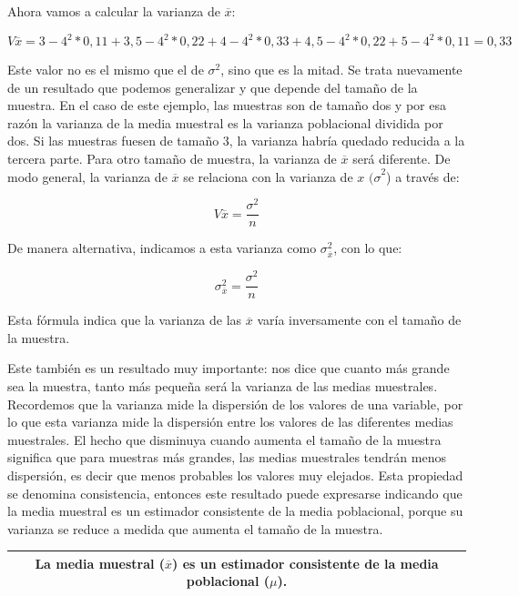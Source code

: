 \documentclass[]{book}
\begin{document}
Ahora vamos a calcular la varianza de \(\overline{x}\):

\[V\overline{x} = 3 - 4^{2}*0,11 + 3,5 - 4^{2}*0,22 + 4 - 4^{2}*0,33 + 4,5 - 4^{2}*0,22 + 5 - 4^{2}*0,11 = 0,33\]

Este valor no es el mismo que el de \(\sigma^{2}\), sino que es la mitad.
Se trata nuevamente de un resultado que podemos generalizar y que
depende del tamaño de la muestra. En el caso de este ejemplo, las
muestras son de tamaño dos y por esa razón la varianza de la media
muestral es la varianza poblacional dividida por dos. Si las muestras
fuesen de tamaño 3, la varianza habría quedado reducida a la tercera
parte. Para otro tamaño de muestra, la varianza de \(\overline{x}\) será
diferente. De modo general, la varianza de \(\overline{x}\) se relaciona
con la varianza de \(x\) \({(\sigma}^{2}\)) a través de:

\[V\overline{x} = \frac{\sigma^{2}}{n}\]

De manera alternativa, indicamos a esta varianza como
\(\sigma_{\overline{x}}^{2}\), con lo que:

\[\sigma_{\overline{x}}^{2} = \frac{\sigma^{2}}{n}\]

Esta fórmula indica que la varianza de las \(\overline{x}\) varía
inversamente con el tamaño de la muestra.

Este también es un resultado muy importante: nos dice que cuanto más
grande sea la muestra, tanto más pequeña será la varianza de las medias
muestrales. Recordemos que la varianza mide la dispersión de los valores
de una variable, por lo que esta varianza mide la dispersión entre los
valores de las diferentes medias muestrales. El hecho que disminuya
cuando aumenta el tamaño de la muestra significa que para muestras más
grandes, las medias muestrales tendrán menos dispersión, es decir que
menos probables los valores muy elejados. Esta propiedad se denomina
consistencia, entonces este resultado puede expresarse indicando que la
media muestral es un estimador consistente de la media poblacional,
porque su varianza se reduce a medida que aumenta el tamaño de la
muestra.

\begin{longtable}[]{@{}c@{}}
\toprule
\endhead
\begin{minipage}[t]{0.97\columnwidth}\centering
La media muestral (\(\overline{x}\)) es un estimador \textbf{consistente} de la media poblacional (\(\mu\)).\strut
\end{minipage}\tabularnewline
\bottomrule
\end{longtable}
\end{document}
